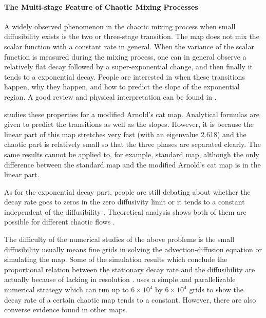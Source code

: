 \documentclass{article}
\begin{document}
\paragraph{The Multi-stage Feature of Chaotic Mixing Processes}
A widely observed phenomenon in the chaotic mixing process when small diffusibility exists is the two or three-stage transition\cite{Thiffeault2003-13}\cite{Fereday2002}\cite{Antonsen1996}. The map does not mix the scalar function with 
a constant rate in general. When the variance of the scalar function is measured during the mixing process, one can in general observe a relatively flat decay followed by a super-exponential change, and then finally it tends to a exponential decay. People are interested in when these transitions happen, why they happen, and how to predict the slope of the 
exponential region. A good review and physical interpretation can be found in \cite{Thiffeault2004}.  

\cite{Thiffeault2003-13} studies these properties for a modified Arnold's cat map. Analytical formulas are given to predict the transitions as well as the slopes. However, it is because the linear part of this map stretches very fast (with an eigenvalue 2.618) and the chaotic part is relatively small so that the three phases are separated clearly. The same results cannot be applied to, for example, standard map, although the only difference between the standard map and the modified Arnold's cat map is in the linear part.

As for the exponential decay part, people are still debating about whether the decay rate goes to zeros in the zero diffusivity limit or it tends to a constant independent of the diffusibility \cite{Thiffeault2004}\cite{Tsang2005}. Theoretical analysis shows both of them are possible for different chaotic flows \cite{Haynes2005}.  
 
The difficulty of the numerical studies of the above problems is the small diffusibility usually means fine grids in solving the advection-diffusion equation or simulating the map. Some of the simulation results which conclude the proportional relation 
between the stationary decay rate and the diffusibility are actually because of lacking in resolution \cite{Cerbelli2003}\cite{Pikovsky2003}. \cite{Tsang2005} uses a simple and parallelizable numerical strategy which can run up to $6 \times 10^4$ by $6 \times 10^4$ grids to show the decay rate of a certain chaotic map tends to a constant. However, there are also converse evidence found in other maps. 
\end{document}
